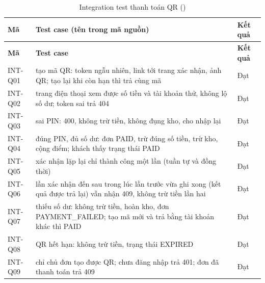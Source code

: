 {\small
\begin{longtable}{@{}L{1.9cm}L{10.6cm}L{1.3cm}@{}}
\caption{Integration test thanh toán QR ()}\label{tab:intq}\\
\toprule
\textbf{Mã} & \textbf{Test case (tên trong mã nguồn)} & \textbf{Kết quả} \\ \midrule \endfirsthead
\toprule \textbf{Mã} & \textbf{Test case} & \textbf{Kết quả} \\ \midrule \endhead
\bottomrule \endfoot
INT-Q01 & tạo mã QR: token ngẫu nhiên, link tới trang xác nhận, ảnh QR; tạo lại khi còn hạn thì trả cùng mã & Đạt \\
INT-Q02 & trang điện thoại xem được số tiền và tài khoản thử, không lộ số dư; token sai trả 404 & Đạt \\
INT-Q03 & sai PIN: 400, không trừ tiền, không đụng kho, cho nhập lại & Đạt \\
INT-Q04 & đúng PIN, đủ số dư: đơn PAID, trừ đúng số tiền, trừ kho, cộng điểm; khách thấy trạng thái PAID & Đạt \\
INT-Q05 & xác nhận lặp lại chỉ thành công một lần (tuần tự và đồng thời) & Đạt \\
INT-Q06 & lần xác nhận đến sau trong lúc lần trước vừa ghi xong (kết quả được trả lại) vẫn nhận 409, không trừ tiền lần hai & Đạt \\
INT-Q07 & thiếu số dư: không trừ tiền, hoàn kho, đơn PAYMENT\_FAILED; tạo mã mới và trả bằng tài khoản khác thì PAID & Đạt \\
INT-Q08 & QR hết hạn: không trừ tiền, trạng thái EXPIRED & Đạt \\
INT-Q09 & chỉ chủ đơn tạo được QR; chưa đăng nhập trả 401; đơn đã thanh toán trả 409 & Đạt \\
\end{longtable}
}